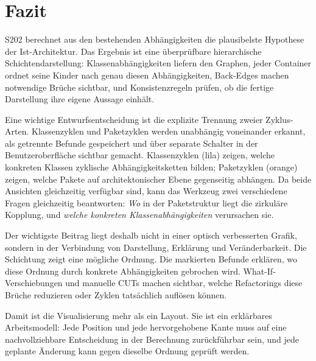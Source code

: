 \documentclass[a4paper,11pt]{article}
\begin{document}
\section{Fazit}

S202 berechnet aus den bestehenden Abh\"angigkeiten die plausibelste Hypothese
der Ist-Architektur. Das Ergebnis ist eine \"uberpr\"ufbare hierarchische
Schichtendarstellung: Klassenabh\"angigkeiten liefern den Graphen, jeder
Container ordnet seine Kinder nach genau diesen Abh\"angigkeiten, Back-Edges
machen notwendige Br\"uche sichtbar, und Konsistenzregeln pr\"ufen, ob die
fertige Darstellung ihre eigene Aussage einh\"alt.

Eine wichtige Entwurfsentscheidung ist die explizite Trennung zweier
Zyklus-Arten. Klassenzyklen und Paketzyklen werden unabh\"angig voneinander
erkannt, als getrennte Befunde gespeichert und \"uber separate Schalter in der
Benutzeroberfl\"ache sichtbar gemacht. Klassenzyklen (lila) zeigen, welche
konkreten Klassen zyklische Abh\"angigkeitsketten bilden; Paketzyklen (orange)
zeigen, welche Pakete auf architektonischer Ebene gegenseitig abh\"angen. Da
beide Ansichten gleichzeitig verf\"ugbar sind, kann das Werkzeug zwei
verschiedene Fragen gleichzeitig beantworten: \emph{Wo} in der Paketstruktur
liegt die zirkul\"are Kopplung, und \emph{welche konkreten Klassenabh\"angigkeiten}
verursachen sie.

Der wichtigste Beitrag liegt deshalb nicht in einer optisch verbesserten
Grafik, sondern in der Verbindung von Darstellung, Erkl\"arung und
Ver\"anderbarkeit. Die Schichtung zeigt eine m\"ogliche Ordnung. Die markierten
Befunde erkl\"aren, wo diese Ordnung durch konkrete Abh\"angigkeiten gebrochen
wird. What-If-Verschiebungen und manuelle CUTs machen sichtbar, welche
Refactorings diese Br\"uche reduzieren oder Zyklen tats\"achlich aufl\"osen
k\"onnen.

Damit ist die Visualisierung mehr als ein Layout. Sie ist ein erkl\"arbares
Arbeitsmodell: Jede Position und jede hervorgehobene Kante muss auf eine
nachvollziehbare Entscheidung in der Berechnung zur\"uckf\"uhrbar sein, und
jede geplante \"Anderung kann gegen dieselbe Ordnung gepr\"uft werden.
\end{document}
